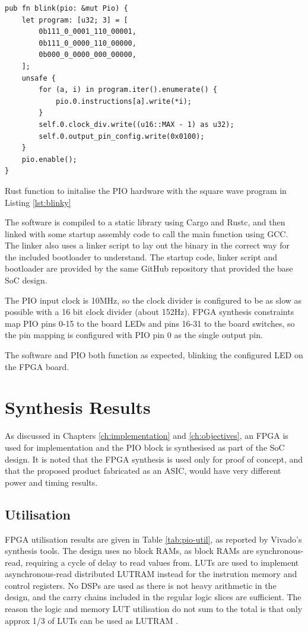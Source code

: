 \begin{listing}[h!]
    \begin{verbatim}
pub fn blink(pio: &mut Pio) {
    let program: [u32; 3] = [
        0b111_0_0001_110_00001,
        0b111_0_0000_110_00000,
        0b000_0_0000_000_00000,
    ];
    unsafe {
        for (a, i) in program.iter().enumerate() {
            pio.0.instructions[a].write(*i);
        }
        self.0.clock_div.write((u16::MAX - 1) as u32);
        self.0.output_pin_config.write(0x0100);
    }
    pio.enable();
}
    \end{verbatim}
    \caption{Rust function to initalise the PIO hardware with the square wave program in Listing \ref{lst:blinky}}
    \label{lst:blink-sw}
\end{listing}

The software is compiled to a static library using Cargo and Rustc, and then linked with some startup assembly code to call the main function using GCC. The linker also uses a linker script to lay out the binary in the correct way for the included bootloader to understand. The startup code, linker script and bootloader are provided by the same GitHub repository that provided the base SoC design.

The PIO input clock is 10MHz, so the clock divider is configured to be as slow as possible with a 16 bit clock divider (about 152Hz). FPGA synthesis constraints map PIO pins 0-15 to the board LEDs and pins 16-31 to the board switches, so the pin mapping is configured with PIO pin 0 as the single output pin.

The software and PIO both function as expected, blinking the configured LED on the FPGA board.

\section{Synthesis Results}
As discussed in Chapters \ref{ch:implementation} and \ref{ch:objectives}, an FPGA is used for implementation and the PIO block is synthesised as part of the SoC design. It is noted that the FPGA synthesis is used only for proof of concept, and that the proposed product fabricated as an ASIC, would have very different power and timing results.

\subsection{Utilisation}
\label{sec:synth-res}

FPGA utilisation results are given in Table \ref{tab:pio-util}, as reported by Vivado's synthesis tools. The design uses no block RAMs, as block RAMs are synchronous-read, requiring a cycle of delay to read values from. LUTs are used to implement asynchronous-read distributed LUTRAM instead for the instrution memory and control registers. No DSPs are used as there is not heavy arithmetic in the design, and the carry chains included in the regular logic slices are sufficient. The reason the logic and memory LUT utilisation do not sum to the total is that only approx 1/3 of LUTs can be used as LUTRAM \cite{clb_ug}.

